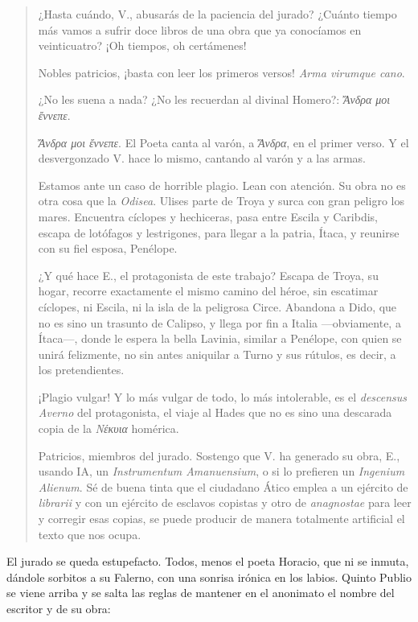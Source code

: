 \documentclass[11pt,a4paper]{article}
\begin{document}
\begin{quotation}
¿Hasta cuándo, V., abusarás de la paciencia del jurado? ¿Cuánto tiempo más vamos a sufrir doce libros de una obra que ya conocíamos en veinticuatro? ¡Oh tiempos, oh certámenes!

Nobles patricios, ¡basta con leer los primeros versos! \emph{Arma virumque cano}.

¿No les suena a nada? ¿No les recuerdan al divinal Homero?: \emph{Ἄνδρα μοι ἔννεπε}.

\emph{Ἄνδρα μοι ἔννεπε}. El Poeta canta al varón, a \emph{Ἄνδρα}, en el primer verso. Y el desvergonzado V. hace lo mismo, cantando al varón y a las armas.

Estamos ante un caso de horrible plagio. Lean con atención. Su obra no es otra cosa que la \emph{Odisea}. Ulises parte de Troya y surca con gran peligro los mares. Encuentra cíclopes y hechiceras, pasa entre Escila y Caribdis, escapa de lotófagos y lestrigones, para llegar a la patria, Ítaca, y reunirse con su fiel esposa, Penélope.

¿Y qué hace E., el protagonista de este trabajo? Escapa de Troya, su hogar, recorre exactamente el mismo camino del héroe, sin escatimar cíclopes, ni Escila, ni la isla de la peligrosa Circe. Abandona a Dido, que no es sino un trasunto de Calipso, y llega por fin a Italia ---obviamente, a Ítaca---, donde le espera la bella Lavinia, similar a Penélope, con quien se unirá felizmente, no sin antes aniquilar a Turno y sus rútulos, es decir, a los pretendientes.

¡Plagio vulgar! Y lo más vulgar de todo, lo más intolerable, es el \emph{descensus Averno} del protagonista, el viaje al Hades que no es sino una descarada copia de la \emph{Νέκυια} homérica.

Patricios, miembros del jurado. Sostengo que V. ha generado su obra, E., usando IA, un \emph{Instrumentum Amanuensium}, o si lo prefieren un \emph{Ingenium Alienum}. Sé de buena tinta que el ciudadano Ático emplea a un ejército de \emph{librarii} y con un ejército de esclavos copistas y otro de \emph{anagnostae} para leer y corregir esas copias, se puede producir de manera totalmente artificial el texto que nos ocupa.
\end{quotation}

El jurado se queda estupefacto. Todos, menos el poeta Horacio, que ni se inmuta, dándole sorbitos a su Falerno, con una sonrisa irónica en los labios. Quinto Publio se viene arriba y se salta las reglas de mantener en el anonimato el nombre del escritor y de su obra:
\end{document}
